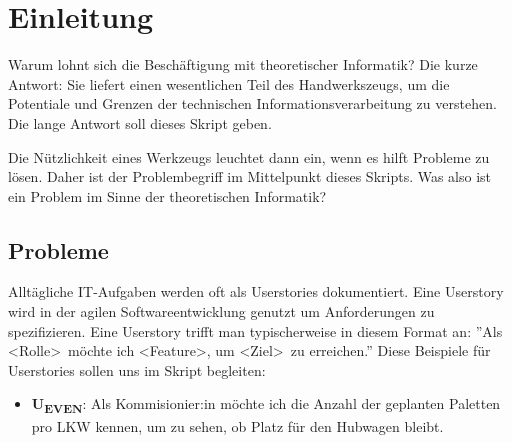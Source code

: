 \chapter{Einleitung}\label{einleitung}
Warum lohnt sich die Beschäftigung mit theoretischer Informatik?
Die kurze Antwort: Sie liefert einen wesentlichen Teil des Handwerkszeugs,
um die Potentiale und Grenzen der technischen Informationsverarbeitung zu verstehen.
Die lange Antwort soll dieses Skript geben.

Die Nützlichkeit eines Werkzeugs leuchtet dann ein,
wenn es hilft Probleme zu lösen.
Daher ist der Problembegriff im Mittelpunkt dieses Skripts.
Was also ist ein Problem im Sinne der theoretischen Informatik?

\section{Probleme}

Alltägliche IT-Aufgaben werden oft als Userstories dokumentiert.
Eine Userstory wird in der agilen Softwareentwicklung genutzt um Anforderungen zu spezifizieren.
Eine Userstory trifft man typischerweise in diesem Format an:
''Als \textless Rolle\textgreater\ möchte ich \textless Feature\textgreater,
um \textless Ziel\textgreater\ zu erreichen.''
Diese Beispiele für Userstories sollen uns im Skript begleiten:

\begin{itemize}
    \item \textbf{U\textsubscript{EVEN}}: Als Kommisionier:in
         möchte ich die Anzahl der geplanten Paletten pro LKW kennen,
         um zu sehen, ob Platz für den Hubwagen bleibt. 
\end{itemize}

